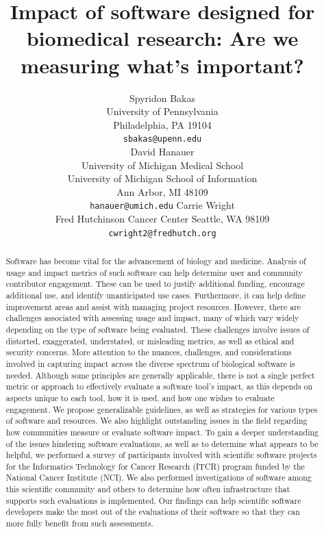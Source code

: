 \documentclass{article}
\title{Impact of software designed for biomedical research: Are we measuring what's important?}
\author{
Spyridon Bakas \\
    University of Pennsylvania \\
    Philadelphia, PA 19104 \\
    \texttt{sbakas@upenn.edu} \\
\AND
David Hanauer \\
    University of Michigan Medical School\\
    University of Michigan School of Information\\
    Ann Arbor, MI 48109\\
    \texttt{hanauer@umich.edu}
\AND
Carrie Wright \\
    Fred Hutchinson Cancer Center
    Seattle, WA 98109 \\
    \texttt{cwright2@fredhutch.org}\\
}
\begin{document}
\maketitle
\begin{abstract}
Software has become vital for the advancement of biology and medicine. Analysis of usage and impact metrics of such software can help determine user and community contributor engagement. These can be used to justify additional funding, encourage additional use, and identify unanticipated use cases. Furthermore, it can help define improvement areas and assist with managing project resources. However, there are challenges associated with assessing usage and impact, many of which vary widely depending on the type of software being evaluated. These challenges involve issues of distorted, exaggerated, understated, or misleading metrics, as well as ethical and security concerns.  More attention to the nuances, challenges, and considerations involved in capturing impact across the diverse spectrum of biological software is needed. Although some principles are generally applicable, there is not a single perfect metric or approach to effectively evaluate a software tool’s impact, as this depends on aspects unique to each tool, how it is used, and how one wishes to evaluate engagement. We propose generalizable guidelines, as well as strategies for various types of software and resources. We also highlight outstanding issues in the field regarding how communities measure or evaluate software impact. To gain a deeper understanding of the issues hindering software evaluations, as well as to determine what appears to be helpful, we performed a survey of participants involved with scientific software projects for the Informatics Technology for Cancer Research (ITCR) program funded by the National Cancer Institute (NCI). We also performed investigations of software among this scientific community and others to determine how often infrastructure that supports such evaluations is implemented.  Our findings can help scientific software developers make the most out of the evaluations of their software so that they can more fully benefit from such assessments.
\end{abstract}


\end{document}
